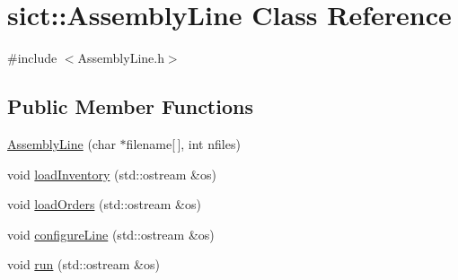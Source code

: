 \hypertarget{classsict_1_1AssemblyLine}{}\section{sict\+::Assembly\+Line Class Reference}
\label{classsict_1_1AssemblyLine}


{\ttfamily \#include $<$Assembly\+Line.\+h$>$}

\subsection*{Public Member Functions}
\begin{DoxyCompactItemize}
\item 
\mbox{\hyperlink{classsict_1_1AssemblyLine_a4474cdbd038302bff4c2156378885b1e}{Assembly\+Line}} (char $\ast$filename\mbox{[}$\,$\mbox{]}, int nfiles)
\item 
void \mbox{\hyperlink{classsict_1_1AssemblyLine_a6262c74cb2d0a5c47cec2552596d8682}{load\+Inventory}} (std\+::ostream \&os)
\item 
void \mbox{\hyperlink{classsict_1_1AssemblyLine_aa8f4560c9a29e2a623d2f5c661b26c94}{load\+Orders}} (std\+::ostream \&os)
\item 
void \mbox{\hyperlink{classsict_1_1AssemblyLine_aa5df8cd3a319d7d1cb81ced7982d406f}{configure\+Line}} (std\+::ostream \&os)
\item 
void \mbox{\hyperlink{classsict_1_1AssemblyLine_a4aa829576688cb8713ad66c1e2075cd9}{run}} (std\+::ostream \&os)
\end{DoxyCompactItemize}
